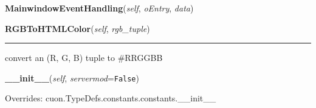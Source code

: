    \label{cuon:Windows:windows:windows:MainwindowEventHandling}

    \vspace{0.5ex}

\hspace{.8\funcindent}\begin{boxedminipage}{\funcwidth}

    \raggedright \textbf{MainwindowEventHandling}(\textit{self}, \textit{oEntry}, \textit{data})

\setlength{\parskip}{2ex}
\setlength{\parskip}{1ex}
    \end{boxedminipage}

    \label{cuon:Windows:windows:windows:RGBToHTMLColor}

    \vspace{0.5ex}

\hspace{.8\funcindent}\begin{boxedminipage}{\funcwidth}

    \raggedright \textbf{RGBToHTMLColor}(\textit{self}, \textit{rgb\_tuple})

    \vspace{-1.5ex}

    \rule{\textwidth}{0.5\fboxrule}
\setlength{\parskip}{2ex}
    convert an (R, G, B) tuple to \#RRGGBB

\setlength{\parskip}{1ex}
    \end{boxedminipage}

    \vspace{0.5ex}

\hspace{.8\funcindent}\begin{boxedminipage}{\funcwidth}

    \raggedright \textbf{\_\_init\_\_}(\textit{self}, \textit{servermod}={\tt False})

\setlength{\parskip}{2ex}
\setlength{\parskip}{1ex}
      Overrides: cuon.TypeDefs.constants.constants.\_\_init\_\_

    \end{boxedminipage}


